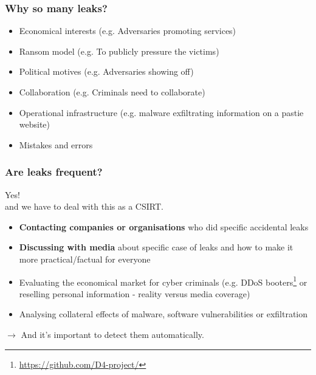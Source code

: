 \documentclass{beamer}
\begin{document}
\begin{frame}
        \frametitle{Why so many leaks?}
        \begin{itemize}
                \item Economical interests (e.g. Adversaries promoting services)
                \item Ransom model (e.g. To publicly pressure the victims)
                \item Political motives (e.g. Adversaries showing off)
                \item Collaboration (e.g. Criminals need to collaborate)
                \item Operational infrastructure (e.g. malware exfiltrating information on a pastie website)
                \item Mistakes and errors
        \end{itemize}
\end{frame}

\begin{frame}
    \frametitle{Are leaks frequent?}
    \begin{center}
    \Large{Yes!}\\ and we have to deal with this as a CSIRT.
    \end{center}

    \begin{itemize}
            \item {\bf Contacting companies or organisations} who did specific accidental leaks
            \item {\bf Discussing with media} about specific case of leaks and how to make it more practical/factual for everyone
            \item Evaluating the economical market for cyber criminals (e.g. DDoS booters\footnote{\url{https://github.com/D4-project/}} or reselling personal information - reality versus media coverage)
            \item Analysing collateral effects of malware, software vulnerabilities or exfiltration
    \end{itemize}

    \begin{center}
    $\rightarrow$ And it's important to detect them automatically.
    \end{center}
\end{frame}
\end{document}
